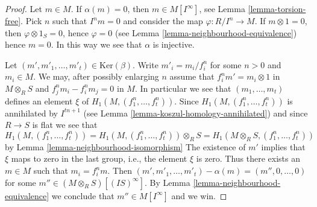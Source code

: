 \begin{proof}
Let $m \in M$. If $\alpha(m) = 0$, then $m \in M[I^\infty]$, see
Lemma \ref{lemma-torsion-free}. Pick $n$ such that $I^n m = 0$
and consider the map $\varphi : R/I^n \to M$.
If $m \otimes 1 = 0$, then $\varphi \otimes 1_S = 0$, hence
$\varphi = 0$ (see
Lemma \ref{lemma-neighbourhood-equivalence})
hence $m = 0$. In this way we see that $\alpha$ is injective.

\medskip\noindent
Let $(m', m'_1, \ldots, m'_t) \in \text{Ker}(\beta)$.
Write $m'_i = m_i/f_i^n$ for some $n > 0$ and $m_i \in M$.
We may, after possibly enlarging $n$ assume that
$f_i^n m' = m_i \otimes 1$ in $M \otimes_R S$ and
$f_j^nm_i - f_i^nm_j = 0$ in $M$.
In particular we see that
$(m_1, \ldots, m_t)$ defines an element $\xi$ of
$H_1(M, (f_1^n, \ldots, f_t^n))$.
Since $H_1(M, (f_1^n, \ldots, f_t^n))$ is annihilated by $I^{tn + 1}$ (see
Lemma \ref{lemma-koszul-homology-annihilated})
and since $R \to S$ is flat we see that
$$
H_1(M, (f_1^n, \ldots, f_t^n)) =
H_1(M, (f_1^n, \ldots, f_t^n)) \otimes_R S =
H_1(M \otimes_R S, (f_1^n, \ldots, f_t^n))
$$
by
Lemma \ref{lemma-neighbourhood-isomorphism}
The existence of $m'$ implies that $\xi$ maps to zero in the last group, i.e.,
the element $\xi$ is zero. Thus there exists an $m \in M$ such that
$m_i = f_i^n m$. Then $(m', m'_1, \ldots, m'_t) - \alpha(m)
= (m'', 0, \ldots, 0)$ for some $m'' \in (M \otimes_R S)[(IS)^\infty]$.
By
Lemma \ref{lemma-neighbourhood-equivalence}
we conclude that $m'' \in M[I^\infty]$ and we win.
\end{proof}

